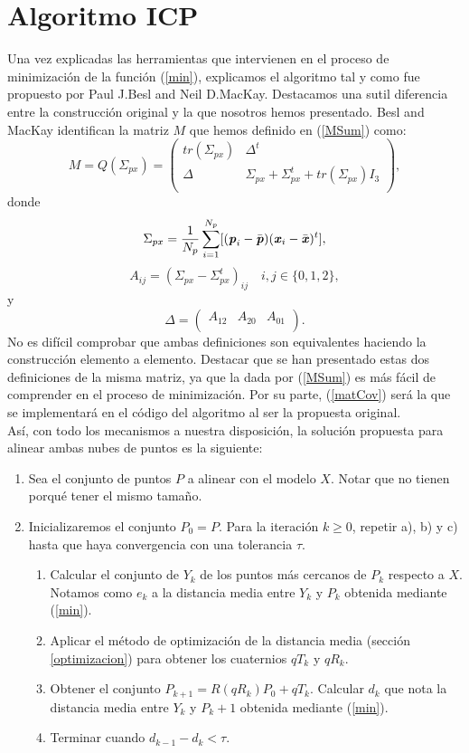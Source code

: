 \section{Algoritmo ICP}\label{algICP}
Una vez explicadas las herramientas que intervienen en el proceso de minimización de la función (\ref{min}), explicamos el algoritmo tal y como fue propuesto por Paul J.Besl and Neil D.MacKay. Destacamos una sutil diferencia entre la construcción original y la que nosotros hemos presentado. Besl and MacKay identifican la matriz $ M $ que hemos definido en (\ref{MSum}) como:
\begin{equation}\label{matCov}
M = Q(\Sigma_{px}) =
 \begin{pmatrix}
tr(\Sigma_{px}) & \Delta^t \\
\Delta & \Sigma_{px} + \Sigma_{px}^t + tr(\Sigma_{px})I_3\\
\end{pmatrix}, 
\end{equation}
donde 
\[
\Sigma_{px} = \frac{1}{N_p}\sum_{i=1}^{N_p} \lbrack (\textbf{\emph{p}}_i-\bar{\textbf{\emph{p}}})(\textbf{\emph{x}}_i - \bar{\textbf{\emph{x}}})^t\rbrack, \]
\[A_{ij} = (\Sigma_{px}-\Sigma_{px}^t)_{ij} \quad i,j \in \lbrace 0,1,2 \rbrace,\]
y 
\[\Delta = \begin{pmatrix}
A_{12} & A_{20} & A_{01}  \\
\end{pmatrix}. \]
No es difícil comprobar que ambas definiciones son equivalentes haciendo la construcción elemento a elemento. Destacar que se han presentado estas dos definiciones de la misma matriz, ya que la dada por (\ref{MSum}) es más fácil de comprender en el proceso de minimización. Por su parte, (\ref{matCov}) será la que se implementará en el código del algoritmo al ser la propuesta original. \\

Así, con todo los mecanismos a nuestra disposición, la solución propuesta para alinear ambas nubes de puntos es la siguiente:
\begin{enumerate}
\item Sea el conjunto de puntos $ P $ a alinear con el modelo $ X $. Notar que no tienen porqué tener el mismo tamaño.
\item Inicializaremos el conjunto $ P_0 = P $. Para la iteración $ k \geq 0$, repetir a), b) y c) hasta que haya convergencia con una tolerancia $ \tau $.
\begin{enumerate}
	\item Calcular el conjunto de $ Y_k  $ de los puntos más cercanos de $ P_k $ respecto a $ X $. Notamos como $ e_{k} $ a la distancia media entre $ Y_k  $ y $ P_k  $ obtenida mediante (\ref{min}).
	\item Aplicar el método de optimización de la distancia media (sección \ref{optimizacion}) para obtener los cuaternios $ qT_{k} $ y $ qR_{k} $. 
	\item Obtener el conjunto $ P_{k+1} = R(qR_{k})P_0 + qT_{k} $. Calcular $ d_k $ que nota la distancia media entre $ Y_k  $ y $ P_k+1  $ obtenida mediante (\ref{min}).
	\item Terminar cuando $ d_{k-1} - d_k < \tau $.
\end{enumerate}
\end{enumerate}


